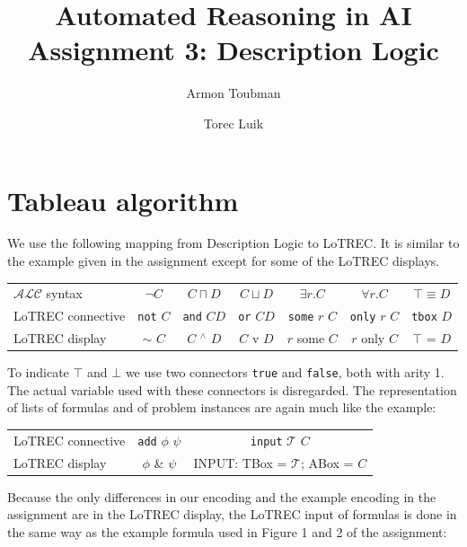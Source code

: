 \documentclass[11pt]{article} %
\title{Automated Reasoning in AI\\
Assignment 3: Description Logic}
\author{Armon Toubman \and Torec Luik}
\begin{document}
\maketitle

\section{Tableau algorithm}
\label{sec:tableau}

We use the following mapping from Description Logic to LoTREC. It is similar to the example given in the assignment except for some of the LoTREC displays.

\begin{table}[h]
\begin{center}
\begin{tabular}{l c c c c c c}
$\mathcal{ALC}$ syntax & $\neg C$ & $C \sqcap D$ & $C \sqcup D$ & $\exists r.C$ & $\forall r.C$ & $\top \equiv D$\\
LoTREC connective & \texttt{not} $C$ & \texttt{and} $C D$ & \texttt{or} $C D$ & \texttt{some} $r$ $C$ & \texttt{only} $r$ $C$ & \texttt{tbox} $D$\\
LoTREC display & $\sim$ $C$ & $C$ $^\wedge$ $D$ & $C$ v $D$ & $r$ some $C$ & $r$ only $C$ & $\top$ = $D$\\
\end{tabular}
\end{center}
\end{table}

To indicate $\top$ and $\bot$ we use two connectors \texttt{true} and \texttt{false}, both with arity 1. The actual variable used with these connectors is disregarded. The representation of lists of formulas and of problem instances are again much like the example:

\begin{table}[h]
\begin{center}
\begin{tabular}{l c c}
LoTREC connective & \texttt{add} $\phi$ $\psi$ & \texttt{input} $\mathcal{T}$ $C$\\
LoTREC display & $\phi$ \& $\psi$ & INPUT: TBox = $\mathcal{T}$; ABox = $C$\\
\end{tabular}
\end{center}
\end{table}

Because the only differences in our encoding and the example encoding in the assignment are in the LoTREC display, the LoTREC input of formulas is done in the same way as the example formula used in Figure 1 and 2 of the assignment:
\end{document}
